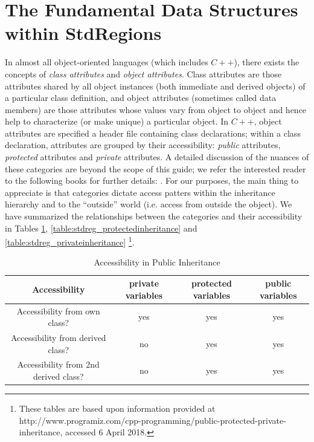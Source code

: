 %
\section{The Fundamental Data Structures within StdRegions}
\label{sec:stdregions-datastructures}

In almost all object-oriented languages (which includes $C++$), there exists the concepts of {\em class attributes} and {\em object attributes}.  Class attributes are those attributes shared by all object instances (both immediate and derived objects) of a particular class definition, and object attributes (sometimes called data members) are those attributes whose values vary from object to object and hence help to characterize (or make unique) a particular object. In $C++$, object attributes are specified a header file containing class declarations; within a class declaration, attributes are grouped by their accessibility: {\em public} attributes, {\em protected} attributes and {\em private} attributes.  A detailed discussion of the nuances of these
categories are beyond the scope of this guide; we refer the interested reader to the following books for further details:  \cite{BStroustrup,SMeyers}.
For our purposes, the main thing to appreciate is that categories dictate access patters within the inheritance hierarchy and to the ``outside'' world 
(i.e. access from outside the object).  We have summarized the relationships between the categories and their accessibility in Tables
\ref{table:stdreg_publicinheritance}, \ref{table:stdreg_protectedinheritance} and \ref{table:stdreg_privateinheritance} \footnote{These tables are based upon information provided at http://www.programiz.com/cpp-programming/public-protected-private-inheritance, accessed 6 April 2018.}.


\begin{table}[ht]
\begin{center}
\caption{Accessibility in Public Inheritance}
\begin{tabular}{c c c c}
\hline\hline
Accessibility & private variables & protected variables & public variables \\
\hline
Accessibility from own class? & yes & yes & yes \\
Accessibility from derived class? & no & yes & yes\\
Accessibility from 2nd derived class? & no & yes & yes\\
\end{tabular}
\end{center}
\label{table:stdreg_publicinheritance}
\end{table}

